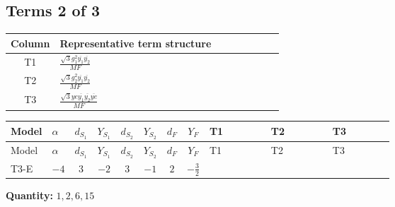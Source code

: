 \documentclass[8pt]{article}
\begin{document}
\begin{landscape}
\subsection*{Terms 2 of 3}
\begin{center}
\begin{tabular}{@{}c >{\raggedright\arraybackslash}p{0.82\linewidth}@{}}
\toprule
Column & Representative term structure \\
\midrule
T1 & \(\displaystyle \frac{\sqrt{3} g_{1}^{2} \overline{y_{1}} \overline{y_{2}}}{MF}\) \\
\midrule
T2 & \(\displaystyle \frac{\sqrt{3} g_{2}^{2} \overline{y_{1}} \overline{y_{2}}}{MF}\) \\
\midrule
T3 & \(\displaystyle \frac{\sqrt{3} ye \overline{y_{1}} \overline{y_{2}} \overline{ye}}{MF}\) \\
\midrule
\bottomrule
\end{tabular}
\end{center}
\smallskip
\tiny
\begin{longtable}{@{}llcccccc >{\raggedright\arraybackslash}p{0.21\linewidth} >{\raggedright\arraybackslash}p{0.21\linewidth} >{\raggedright\arraybackslash}p{0.21\linewidth}@{}}
\toprule
Model & $\alpha$ & $d_{S_1}$ & $Y_{S_1}$ & $d_{S_2}$ & $Y_{S_2}$ & $d_F$ & $Y_F$ & T1 & T2 & T3 \\
\midrule
\endfirsthead
\toprule
Model & $\alpha$ & $d_{S_1}$ & $Y_{S_1}$ & $d_{S_2}$ & $Y_{S_2}$ & $d_F$ & $Y_F$ & T1 & T2 & T3 \\
\midrule
\endhead
T3-E & $-4$ & $3$ & $-2$ & $3$ & $-1$ & $2$ & $-\frac{3}{2}$ & \scriptsize\adjustbox{max width=\linewidth}{$\begin{gathered} \frac{9 \sqrt{3} g_{1}^{2} \overline{y_{1}} \overline{y_{2}}}{8 MF}\end{gathered}$} & \scriptsize\adjustbox{max width=\linewidth}{$\begin{gathered} \frac{15 \sqrt{3} g_{2}^{2} \overline{y_{1}} \overline{y_{2}}}{8 MF}\end{gathered}$} & \scriptsize\adjustbox{max width=\linewidth}{$\begin{gathered} - \frac{\sqrt{3} ye \overline{y_{1}} \overline{y_{2}} \overline{ye}}{12 MF}\end{gathered}$} \\
\midrule
\bottomrule
\end{longtable}
\clearpage
\noindent\textbf{Quantity: }$\mathrm{1,2,6,15}$\par\smallskip

\end{landscape}
\end{document}
